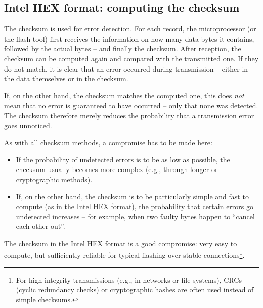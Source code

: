 \documentclass[a4paper,12pt]{article}
\begin{document}
\subsection{Intel HEX format: computing the checksum}

The checksum is used for error detection. For each record, the
microprocessor (or the flash tool) first receives the information on how
many data bytes it contains, followed by the actual bytes – and finally the
checksum. After reception, the checksum can be computed again and compared
with the transmitted one. If they do not match, it is clear that an error
occurred during transmission – either in the data themselves or in the
checksum.

If, on the other hand, the checksum matches the computed one, this does
\textit{not} mean that no error is guaranteed to have occurred – only that
none was detected. The checksum therefore merely reduces the probability that
a transmission error goes unnoticed.

As with all checksum methods, a compromise has to be made here:

\begin{itemize}
    \item
	If the probability of undetected errors is to be as low as possible,
	the checksum usually becomes more complex (e.g., through longer or
	cryptographic methods).
    \item
	If, on the other hand, the checksum is to be particularly simple and
	fast to compute (as in the Intel HEX format), the probability that
	certain errors go undetected increases – for example, when two faulty
	bytes happen to ``cancel each other out''.
\end{itemize}

\newpage
\noindent
The checksum in the Intel HEX format is a good compromise: very easy to
compute, but sufficiently reliable for typical flashing over stable
connections\footnote{
For high-integrity transmissions (e.g., in networks or file systems), CRCs
(cyclic redundancy checks) or cryptographic hashes are often used instead of
simple checksums.}.
\end{document}
